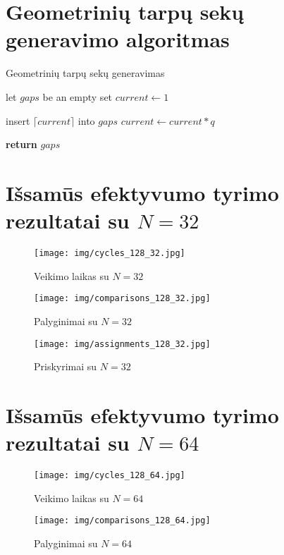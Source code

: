 \documentclass{VUMIFInfBakalaurinis}
\begin{document}
\section{Geometrinių tarpų sekų generavimo algoritmas}

\begin{algorithm}[H]
  \caption{Geometrinių tarpų sekų generavimas}\label{alg:geometric_gaps}
  \begin{algorithmic}[1]
      \State let $gaps$ be an empty set
      \State $current \gets 1$
      
        \State insert $\lceil current \rceil$ into $gaps$
        \State $current \gets current * q$ 
      \EndWhile

      \State \textbf{return} $gaps$
    \EndProcedure
  \end{algorithmic}
\end{algorithm}

\section{Išsamūs efektyvumo tyrimo rezultatai su $N = 32$}

\begin{figure}[H]
  \centering
  \texttt{[image: img/cycles\_128\_32.jpg]}
  \caption{Veikimo laikas su $N = 32$}
\end{figure}

\begin{figure}[H]
  \centering
  \texttt{[image: img/comparisons\_128\_32.jpg]}
  \caption{Palyginimai su $N = 32$}
\end{figure}

\begin{figure}[H]
  \centering
  \texttt{[image: img/assignments\_128\_32.jpg]}
  \caption{Priskyrimai su $N = 32$}
\end{figure}

\section{Išsamūs efektyvumo tyrimo rezultatai su $N = 64$}

\begin{figure}[H]
  \centering
  \texttt{[image: img/cycles\_128\_64.jpg]}
  \caption{Veikimo laikas su $N = 64$}
\end{figure}

\begin{figure}[H]
  \centering
  \texttt{[image: img/comparisons\_128\_64.jpg]}
  \caption{Palyginimai su $N = 64$}
\end{figure}
\end{document}
